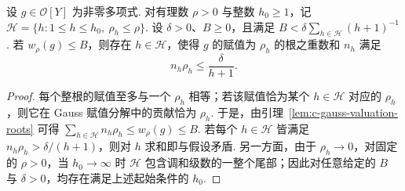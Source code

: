 \begin{lemma}[在分圆半径上控制同半径根的重数]
\label{lem:c-root-radius-count}
\emitthmsource
设 $g\in\mathcal O[Y]$ 为非零多项式. 对有理数 $\rho>0$ 与整数 $h_0\ge1$，记 $\mathcal H=\{h:1\le h\le h_0,\ \rho_h\le\rho\}$.
设 $\delta>0$、$B\ge0$，且满足 $B<\delta\sum_{h\in\mathcal H}(h+1)^{-1}$.
若 $w_\rho(g)\le B$，则存在 $h\in\mathcal H$，使得 $g$ 的赋值为 $\rho_h$ 的根之重数和 $n_h$ 满足
\[
 n_h\rho_h\le\frac{\delta}{h+1}.
\]
\end{lemma}
\begin{proof}
每个整根的赋值至多与一个 $\rho_h$ 相等；若该赋值恰为某个 $h\in\mathcal H$ 对应的 $\rho_h$，则它在 Gauss 赋值分解中的贡献恰为 $\rho_h$.
于是，由引理~\ref{lem:c-gauss-valuation-roots} 可得 $\sum_{h\in\mathcal H}n_h\rho_h\le w_\rho(g)\le B$.
若每个 $h\in\mathcal H$ 皆满足 $n_h\rho_h>\delta/(h+1)$，则对 $h$ 求和即与假设矛盾.
另一方面，由于 $\rho_h\to0$，对固定的 $\rho>0$，当 $h_0\to\infty$ 时 $\mathcal H$ 包含调和级数的一整个尾部；因此对任意给定的 $B$ 与 $\delta>0$，均存在满足上述起始条件的 $h_0$.
\end{proof}

